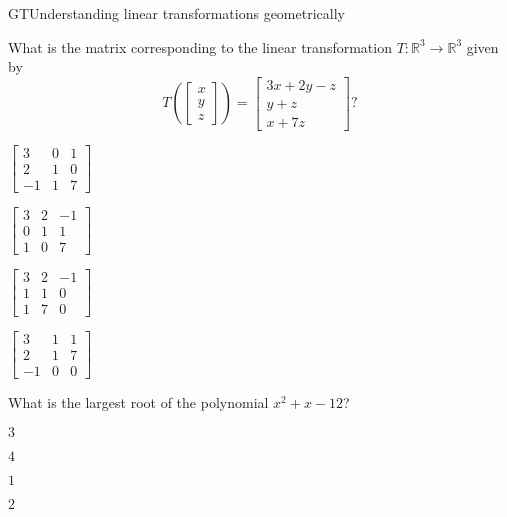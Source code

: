 \documentclass{article}
\newcommand{\IR}{\mathbb{R}}
\begin{document}
\begin{module}{GT}{Understanding linear transformations geometrically}
\begin{readinessAssuranceTest}
\item What is the matrix corresponding to the linear transformation $T: \IR^3 \rightarrow \IR^3$ given by $$T\left( \begin{bmatrix} x \\ y \\ z \end{bmatrix}\right) = \begin{bmatrix} 3x+2y-z \\ y+z \\x+7z \end{bmatrix}?$$
\begin{multicols}{4}
\begin{readinessAssuranceTestChoices}
\item $\begin{bmatrix} 3 & 0 & 1 \\ 2 & 1 & 0 \\ -1 & 1 & 7 \end{bmatrix}$
\item $\begin{bmatrix} 3 & 2 & -1 \\ 0 & 1 & 1 \\ 1 & 0 & 7  \end{bmatrix}$ %
\item $\begin{bmatrix} 3 & 2 & -1 \\ 1 & 1 & 0 \\ 1 & 7 & 0 \end{bmatrix}$
\item $\begin{bmatrix}  3 & 1 & 1 \\ 2 & 1 & 7 \\ -1 & 0 & 0 \end{bmatrix}$

\end{readinessAssuranceTestChoices}
\end{multicols}

\item What is the largest root of the polynomial $x^2+x-12$?
\begin{multicols}{4}
\begin{readinessAssuranceTestChoices}
\item $3$ %
\item $4$
\item $1$
\item $2$
\end{readinessAssuranceTestChoices}
\end{multicols}



\end{readinessAssuranceTest}
\end{module}
\end{document}
